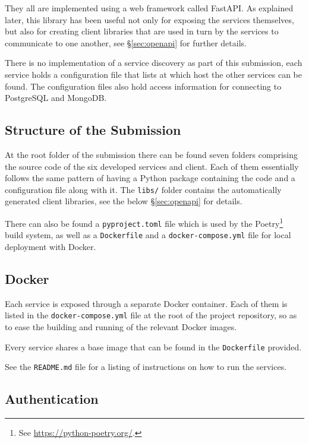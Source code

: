 \documentclass[a4paper]{ifacconf}
\begin{document}
    They all are implemented using a web framework called FastAPI.
    As explained later, this library has been useful not only for exposing the services themselves, but also for creating client libraries that are used in turn by the services to communicate to one another, see \S\ref{sec:openapi} for further details.
    
    There is no implementation of a service discovery as part of this submission, each service holds a configuration file that lists at which host the other services can be found.
    The configuration files also hold access information for connecting to PostgreSQL and MongoDB.
    
    \subsection{Structure of the Submission}
    
    At the root folder of the submission there can be found seven folders comprising the source code of the six developed services and client.
    Each of them essentially follows the same pattern of having a Python package containing the code and a configuration file along with it.
    The \texttt{libs/} folder contains the automatically generated client libraries, see the below \S\ref{sec:openapi} for details.
    
    There can also be found a \texttt{pyproject.toml} file which is used by the Poetry\footnote{
        See \url{https://python-poetry.org/}.
    } build system, as well as a \texttt{Dockerfile} and a \texttt{docker-compose.yml} file for local deployment with Docker.
    
    \subsection{Docker}\label{sec:docker}
    
    Each service is exposed through a separate Docker container.
    Each of them is listed in the \texttt{docker-compose.yml} file at the root of the project repository, so as to ease the building and running of the relevant Docker images.
    
    Every service shares a base image that can be found in the \texttt{Dockerfile} provided.
    
    See the \texttt{README.md} file for a listing of instructions on how to run the services.
    
    \subsection{Authentication}
    
\end{document}
